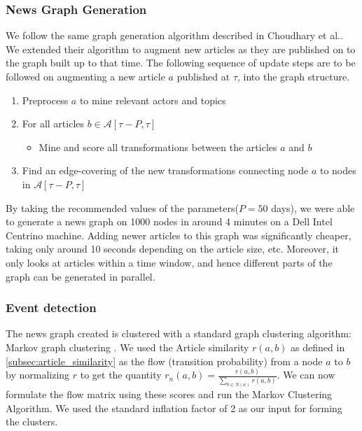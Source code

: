 \subsubsection*{News Graph Generation}\label{sec:graph-desc}
We follow the same graph generation algorithm described in Choudhary et al.\cite{choudhary@ecir2008}. We extended their algorithm to
augment new articles as they are published on to the graph built up to that time. The following sequence of update steps are to
be followed on augmenting a new article $a$ published at $\tau$, into the graph structure.
\begin{enumerate}
  \item Preprocess $a$ to mine relevant actors and topics
  \item For all articles $b \in \mathcal{A}[\tau - P, \tau]$
  \begin{itemize}
  \item Mine and score all transformations between the articles $a$ and $b$
  \end{itemize}
  \item Find an edge-covering of the new transformations connecting node $a$ to nodes in $\mathcal{A}[\tau - P, \tau]$
\end{enumerate}

By taking the recommended values of the parameters($P=50$ days), we were able to generate a news graph on 1000 nodes in around 4 minutes on a Dell Intel Centrino machine.
Adding newer articles to this graph was significantly cheaper, taking only around 10 seconds depending on the article size, etc.
Moreover, it only looks at articles within a time window, and hence different parts of the graph can be generated in parallel.

\subsubsection*{Event detection}
\label{sec:event-detection-summary-context}
The news graph created is clustered with a standard graph clustering algorithm: Markov graph clustering \cite{Dongen00a}.
We used the Article similarity $r(a,b)$ as defined in \ref{subsec:article_similarity} as the flow (transition probability) from a node $a$ to $b$ by normalizing $r$ to get the quantity $r_n(a, b) = \frac{r(a, b)}{\sum_{b \in N(a)}r(a, b)}$. We can now formulate the flow matrix using these scores and run the Markov Clustering Algorithm. We used the standard inflation factor of 2 as our input for forming the clusters. 

